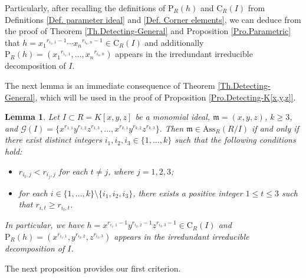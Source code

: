 \documentclass[11pt]{amsart}
\newtheorem{lemma}[theorem]{Lemma}
\begin{document}
Particularly, after recalling the definitions of  $\mathrm{P}_R(h)$ and $\mathrm{C}_R(I)$  from  Definitions \ref{Def. parameter ideal} and \ref{Def. Corner elements},   we can deduce from the proof of  Theorem \ref{Th.Detecting-General} and  Proposition \ref{Pro.Parametric} that $h={x_1}^{r_{{i_1},1}-1} \cdots {x_n}^{r_{{i_n},n}-1}\in \mathrm{C}_R(I)$ and  additionally  $\mathrm{P}_R(h)= ({x_1}^{r_{{i_1},1}}, \ldots,  {x_n}^{r_{{i_n},n}})$ appears in the irredundant irreducible decomposition of $I$. 



The next lemma is an immediate consequence of Theorem \ref{Th.Detecting-General}, which will be used in the proof of 
Proposition \ref{Pro.Detecting-K[x,y,z]}.

\begin{lemma}\label{Lem.Detecting-K[x,y,z]} 
Let $I \subset R=K[x,y,z]$ be a monomial ideal,  $\mathfrak{m}=(x,y,z)$, $k\geq 3$, and  
$\mathcal{G}(I)=\{x^{r_{1,1}} y^{r_{1,2}} z^{r_{1,3}},  \ldots, x^{r_{k,1}} y^{r_{k,2}} z^{r_{k,3}}\}.$
 Then $\mathfrak{m}\in \mathrm{Ass}_R(R/I)$ if and only if there exist distinct integers $i_1, i_2, i_3 \in \{1, \ldots, k\}$ such that the following conditions hold:
\begin{itemize}
\item[(i)] $r_{i_t,j}<r_{i_j,j}$ for each  $t\neq j$, where $j=1, 2,3$;
\item[(ii)]  for each  $i\in\{1, \ldots, k\}\setminus \{i_1, i_2, i_3\}$, there exists a positive integer $1\leq t \leq 3$ such that $r_{i,t}\geq r_{i_t,t}$.
\end{itemize}
In particular, we have  $h=x^{r_{{i_1},1}-1} y^{r_{{i_2},2}-1} z^{r_{{i_3},3}-1} \in \mathrm{C}_R(I)$ and 
$\mathrm{P}_R(h)= (x^{r_{{i_1},1}}, y^{r_{{i_2},2}}, z^{r_{{i_3},3}})$ appears in the irredundant irreducible decomposition of $I$. 
\end{lemma}



 The next proposition  provides our first criterion.
\end{document}
